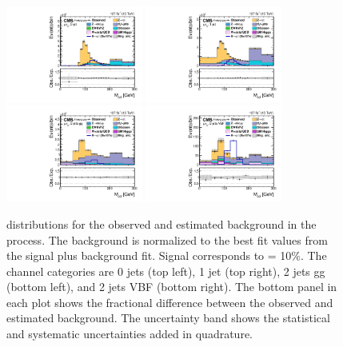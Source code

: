\begin{figure}[htbp!]
  \centering
  \includegraphics[width=0.4\textwidth]{plots/chapter9/CB/mue/0jet.pdf}
  \includegraphics[width=0.4\textwidth]{plots/chapter9/CB/mue/1jet.pdf} \\
  \includegraphics[width=0.4\textwidth]{plots/chapter9/CB/mue/2jet_gg.pdf}
  \includegraphics[width=0.4\textwidth]{plots/chapter9/CB/mue/2jet_vbf.pdf} \\
  \caption{\mcol distributions for the observed and estimated background in the \mue process. The background is normalized to the best fit values from the signal plus background fit. Signal corresponds to \BHmt = 10\%. The \mue channel categories are 0 jets (top left), 1 jet (top right), 2 jets gg (bottom left), and 2 jets VBF (bottom right). The bottom panel in each plot shows the fractional difference between the observed and estimated background. The uncertainty band shows the statistical and systematic uncertainties added in quadrature.}
  \label{fig:mcol_mue}
\end{figure}

